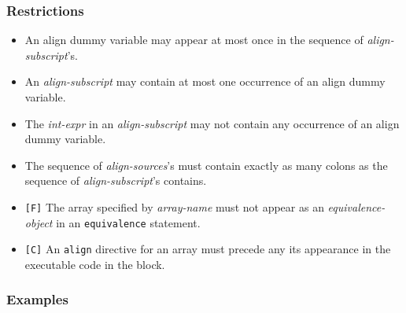 \subsubsection*{Restrictions}

\begin{itemize}
\item An align dummy variable may appear at most once in the sequence of
      {\it align-subscript}'s.
\item An {\it align-subscript} may contain at most one occurrence of an
      align dummy variable.
\item The {\it int-expr} in an {\it align-subscript} may not contain any
      occurrence of an align dummy variable.
\item The sequence of {\it align-sources}'s must contain exactly as many
      colons as the sequence of {\it align-subscript}'s contains.
\item \verb![F]! The array specified by {\it array-name} must not appear
      as an {\it equivalence-object} in an {\tt equivalence} statement.
\item \verb![C]! An {\tt align} directive for an array must
      precede any its appearance in the executable code in the block.
\end{itemize}

\subsubsection*{Examples}


